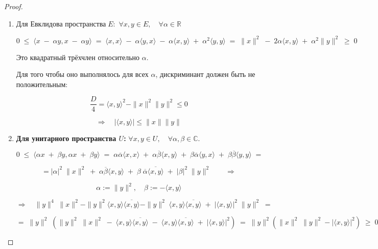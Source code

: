 \vspace{0.2cm}
\begin{proof}
    \begin{enumerate}
    \leavevmode \nl
    
        \item 
        $\textbf{Для Евклидова пространства} \; E:$ \; $\forall x, y \in E, \quad \forall \alpha \in \mathbb{R}$
        
        $$0 \; \leq \; \langle x \; - \; \alpha y, x \; - \; \alpha y \rangle \; = \; \langle x, x \rangle \; - \; \alpha \langle y, x \rangle \; - \; \alpha \langle x, y \rangle \; + \; \alpha^2 \langle y, y \rangle \; = \; \|x\|^2 \; - \; 2 \alpha \langle x, y \rangle \; + \; \alpha^2 \|y\|^2 \; \geq \; 0$$
        
        Это квадратный трёхчлен относительно \( \alpha \). 
        
        Для того чтобы оно выполнялось для всех \( \alpha \), дискриминант должен быть не положительным:
        
        $$\frac{D}{4} = \langle x, y \rangle^2 - \|x\|^2 \|y\|^2 \leq 0$$
        
        
        $$\Longrightarrow \quad |\langle x, y \rangle| \leq \|x\| \|y\|$$
        
    \item \textbf{Для унитарного пространства \( U \):} \quad $\forall x, y \in U, \quad \forall \alpha, \beta \in \mathbb{C}$.
        
        $$0 \; \leq \; \langle \alpha x \; + \; \beta y, \alpha x \; + \; \beta y \rangle \; = \; \alpha \overline{\alpha} \langle x, x \rangle \; + \; \alpha \overline{\beta} \langle x, y \rangle \; + \; \beta \overline{\alpha} \langle y, x \rangle \; + \; \beta \overline{\beta} \langle y, y \rangle \; =$$
        
        $$= |\alpha|^2 \; \|x\|^2 \; + \; \alpha \overline{\beta} \langle x, y \rangle \; + \; \beta \; \overline{\alpha} \overline{\langle x, y \rangle } \; + \; |\beta|^2 \; \|y\|^2 \qquad \Longrightarrow$$
        
        $$\alpha := \|y\|^2 , \quad  \beta := -\langle x, y \rangle$$
 
        $$\Longrightarrow \quad \|y\|^4 \; \|x\|^2 - \|y\|^2 \langle x, y \rangle \overline{\langle x, y \rangle} - \|y\|^2 \; \langle x, y \rangle \overline{\langle x, y \rangle} \; + \; |\langle x, y \rangle |^2 \; \|y\|^2 \; =$$
        
        $$= \; \|y\|^2 \; (\|y\|^2 \; \|x\|^2 \; - \; \langle x, y \rangle \overline{\langle x, y \rangle} \; - \; \langle x,y \rangle \overline{\langle x, y \rangle} \; + \; |\langle x, y \rangle|^2) \; = \; \|y\|^2(\|x\|^2 \; \|y\|^2 - |\langle x, y \rangle|^2) \; \geq \; 0$$      
        

\end{enumerate}
\end{proof}
